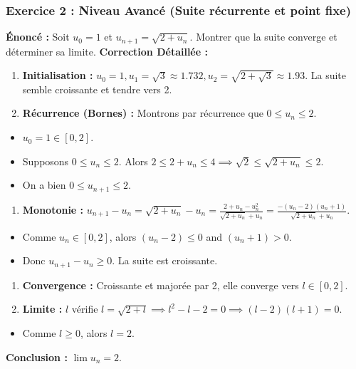 \documentclass[a4paper,11pt]{report}
\begin{document}
\subsubsection*{Exercice 2 : Niveau Avancé (Suite récurrente et point fixe)}
\textbf{Énoncé :} Soit $u_0 = 1$ et $u_{n+1} = \sqrt{2 + u_n}$. Montrer que la suite converge et déterminer sa limite.
\textbf{Correction Détaillée :}
\begin{enumerate}
\item \textbf{Initialisation :} $u_0 = 1, u_1 = \sqrt{3} \approx 1.732, u_2 = \sqrt{2+\sqrt{3}} \approx 1.93$. La suite semble croissante et tendre vers 2.

\item \textbf{Récurrence (Bornes) :} Montrons par récurrence que $0 \le u_n \le 2$.
\end{enumerate}
\begin{itemize}
\item $u_0 = 1 \in [0, 2]$.

\item Supposons $0 \le u_n \le 2$. Alors $2 \le 2+u_n \le 4 \implies \sqrt{2} \le \sqrt{2+u_n} \le 2$.

\item On a bien $0 \le u_{n+1} \le 2$.
\end{itemize}
\begin{enumerate}
\item \textbf{Monotonie :} $u_{n+1} - u_n = \sqrt{2+u_n} - u_n = \frac{2+u_n - u_n^2}{\sqrt{2+u_n} + u_n} = \frac{-(u_n - 2)(u_n + 1)}{\sqrt{2+u_n} + u_n}$.
\end{enumerate}
\begin{itemize}
\item Comme $u_n \in [0, 2]$, alors $(u_n - 2) \le 0$ and $(u_n+1) > 0$.

\item Donc $u_{n+1} - u_n \ge 0$. La suite est croissante.
\end{itemize}
\begin{enumerate}
\item \textbf{Convergence :} Croissante et majorée par 2, elle converge vers $l \in [0, 2]$.

\item \textbf{Limite :} $l$ vérifie $l = \sqrt{2+l} \implies l^2 - l - 2 = 0 \implies (l-2)(l+1) = 0$.
\end{enumerate}
\begin{itemize}
\item Comme $l \ge 0$, alors $l = 2$.
\end{itemize}
\textbf{Conclusion :} $\lim u_n = 2$.
\end{document}

